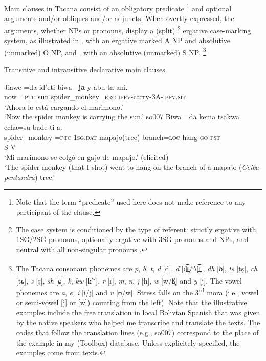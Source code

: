 \documentclass[output=paper]{langsci/langscibook}
\begin{document}
Main clauses in Tacana consist of an obligatory predicate%
%
    \footnote{Note that the term ``predicate'' used here does not make
    reference to any participant of the clause.} 
%
and optional arguments and\slash or obliques
and\slash or adjuncts. When overtly expressed, the arguments, whether NPs
or pronouns, display a (split)%
%
    \footnote{The case system is conditioned by the type of referent:
    strictly ergative with 1SG\slash 2SG pronouns, optionally ergative
    with 3SG pronouns and NPs, and neutral with all non-singular
    pronouns \parencites{Guillaume2016-tac}{GuillaumeXXXX}.} 
%
ergative
case-marking system, as illustrated in , with an ergative
marked A NP and absolutive (unmarked) O NP, and
, with an
absolutive (unmarked) S NP.%
%
\footnote{\label{fn:tacana-phonemes}The Tacana consonant phonemes are
\textit{p}, \textit{b}, \textit{t}, \textit{d} [ḍ], \textit{ď}
[d̪͡t̪/\textsuperscript{ə}d̪͡t̪], \textit{dh}
[ð], \textit{ts} [ṭṣ], \textit{ch} [tɕ],
\textit{s} [ṣ], \textit{sh} [ɕ], \textit{k}, \textit{kw}
[k\textsuperscript{w}], \textit{r} [ɾ], \textit{m}, \textit{n},
\textit{j} [h], \textit{w} [w/ß̞] and \textit{y} [j]. The vowel
phonemes are \textit{a}, \textit{e,} \textit{i} [i/j] and \textit{u}
[ʊ/w]. Stress falls on the 3\textsuperscript{rd} mora (i.e., vowel
or semi-vowel [j] or [w]) counting from the left). Note that the
illustrative examples include the free translation in local Bolivian
Spanish that was given by the native speakers who helped me transcribe and
translate the texts. The codes that follow the translation lines (e.g.,
so007) correspond to the place of the example in my (Toolbox) database.
Unless explicitely specified, the examples come from texts.} 
%
\begin{exe}\ex\label{ex:tacana-monkey-sun-branch}  Transitive and
intransitive declarative main clauses
\begin{xlist}\ex\label{ex:tacana-monkey-sun}
  \gll Jiawe  =da
id'eti
biwa\textbf{=ja}
y-abu-ta-{\op}a{\cp}ni.\\
now  =\textsc{ptc}  sun  spider\_monkey=\textsc{erg}
\textsc{ipfv}-carry-3A-\textsc{ipfv.sit}\\
\glt `Ahora lo está cargando el marimono.'\\
`Now the spider monkey is carrying the sun.' so007
%
\ex\label{ex:tacana-monkey-branch}
\glll 
Biwa  =da  kema  {\ob}tsakwa  echa=su{\cb}  bade-ti-a.\\
    spider\_monkey  =\textsc{ptc}  1\textsc{sg.dat}  mapajo(tree)
    branch=\textsc{loc}  hang-\textsc{go-pst}\\
S {} {} {} V \\
\glt `Mi marimono se colgó en gajo de mapajo.' (elicited)\\
`The spider monkey (that I shot) went to hang on the branch of a mapajo
(\textit{Ceiba pentandra}) tree.'
\end{xlist}\end{exe}%
\end{document}
